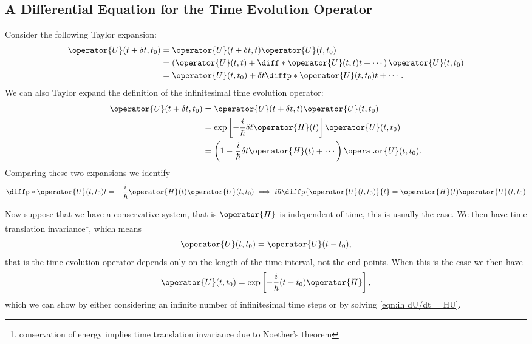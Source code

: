 \documentclass[fleqn]{NotesClass}
\newcommand*{\hamiltonian}{H}
\begin{document}
    \subsection{A Differential Equation for the Time Evolution Operator}
    Consider the following Taylor expansion:
    \begin{align}
        \operator{U}(t + \delta t, t_0) &= \operator{U}(t + \delta t, t)\operator{U}(t, t_0)\\
        &= \left( \operator{U}(t, t) + \diff*{\operator{U}(t, t)}{t} + \dotsb \right)\operator{U}(t, t_0)\\
        &= \operator{U}(t, t_0) + \delta t \diffp*{\operator{U}(t, t_0)}{t} + \dotsb.
    \end{align}
    We can also Taylor expand the definition of the infinitesimal time evolution operator:
    \begin{align}
        \operator{U}(t + \delta t, t_0) &= \operator{U}(t + \delta t, t)\operator{U}(t, t_0)\\
        &= \exp\left[ -\frac{i}{\hbar}\delta t\operator{\hamiltonian}(t) \right] \operator{U}(t, t_0)\\
        &= \left( 1 - \frac{i}{\hbar}\delta t \operator{\hamiltonian}(t) + \dotsb \right) \operator{U}(t, t_0).
    \end{align}
    Comparing these two expansions we identify
    \begin{equation}\label{eqn:ih dU/dt = HU}
        \diffp*{\operator{U}(t, t_0)}{t} = -\frac{i}{\hbar} \operator{\hamiltonian}(t) \operator{U}(t, t_0) \implies i\hbar\diffp{\operator{U}(t, t_0)}{t} = \operator{\hamiltonian}(t)\operator{U}(t, t_0)
    \end{equation}
    
    Now suppose that we have a conservative system, that is \(\operator{\hamiltonian}\) is independent of time, this is usually the case.
    We then have time translation invariance\footnote{conservation of energy implies time translation invariance due to Noether's theorem}, which means
    \begin{equation}
        \operator{U}(t, t_0) = \operator{U}(t - t_0),
    \end{equation}
    that is the time evolution operator depends only on the length of the time interval, not the end points.
    When this is the case we then have
    \begin{equation}
        \operator{U}(t, t_0) = \exp\left[ -\frac{i}{\hbar}(t - t_0)\operator{\hamiltonian} \right],
    \end{equation}
    which we can show by either considering an infinite number of infinitesimal time steps or by solving \cref{eqn:ih dU/dt = HU}.
    
\end{document}
